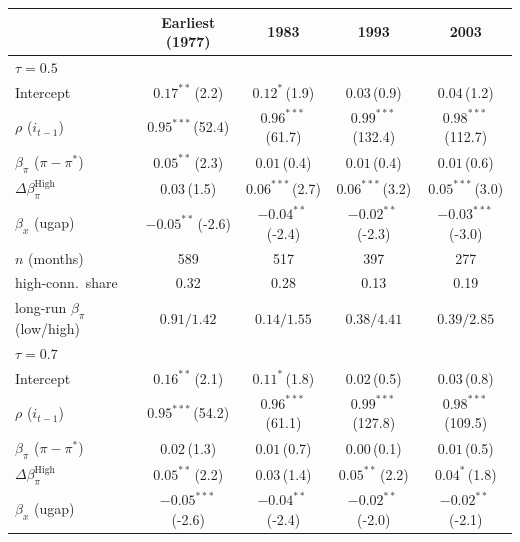 \setlength{\tabcolsep}{4pt}\scriptsize
\begin{tabular}{lcccc}
\toprule
 & Earliest (1977) & 1983 & 1993 & 2003 \\
\midrule
\multicolumn{5}{l}{\textit{$\tau=0.5$}} \\
Intercept & $0.17^{**}$\,{\scriptsize(2.2)} & $0.12^{*}$\,{\scriptsize(1.9)} & $0.03$\,{\scriptsize(0.9)} & $0.04$\,{\scriptsize(1.2)} \\
$\rho$ ($i_{t-1}$) & $0.95^{***}$\,{\scriptsize(52.4)} & $0.96^{***}$\,{\scriptsize(61.7)} & $0.99^{***}$\,{\scriptsize(132.4)} & $0.98^{***}$\,{\scriptsize(112.7)} \\
$\beta_\pi$ ($\pi-\pi^*$) & $0.05^{**}$\,{\scriptsize(2.3)} & $0.01$\,{\scriptsize(0.4)} & $0.01$\,{\scriptsize(0.4)} & $0.01$\,{\scriptsize(0.6)} \\
$\Delta\beta_\pi^{\text{High}}$ & $0.03$\,{\scriptsize(1.5)} & $0.06^{***}$\,{\scriptsize(2.7)} & $0.06^{***}$\,{\scriptsize(3.2)} & $0.05^{***}$\,{\scriptsize(3.0)} \\
$\beta_x$ (ugap) & $-0.05^{**}$\,{\scriptsize(-2.6)} & $-0.04^{**}$\,{\scriptsize(-2.4)} & $-0.02^{**}$\,{\scriptsize(-2.3)} & $-0.03^{***}$\,{\scriptsize(-3.0)} \\
\addlinespace
$n$ (months) & 589 & 517 & 397 & 277 \\
high-conn.\ share & 0.32 & 0.28 & 0.13 & 0.19 \\
long-run $\beta_\pi$ (low/high) & $0.91/1.42$ & $0.14/1.55$ & $0.38/4.41$ & $0.39/2.85$ \\
\midrule
\multicolumn{5}{l}{\textit{$\tau=0.7$}} \\
Intercept & $0.16^{**}$\,{\scriptsize(2.1)} & $0.11^{*}$\,{\scriptsize(1.8)} & $0.02$\,{\scriptsize(0.5)} & $0.03$\,{\scriptsize(0.8)} \\
$\rho$ ($i_{t-1}$) & $0.95^{***}$\,{\scriptsize(54.2)} & $0.96^{***}$\,{\scriptsize(61.1)} & $0.99^{***}$\,{\scriptsize(127.8)} & $0.98^{***}$\,{\scriptsize(109.5)} \\
$\beta_\pi$ ($\pi-\pi^*$) & $0.02$\,{\scriptsize(1.3)} & $0.01$\,{\scriptsize(0.7)} & $0.00$\,{\scriptsize(0.1)} & $0.01$\,{\scriptsize(0.5)} \\
$\Delta\beta_\pi^{\text{High}}$ & $0.05^{**}$\,{\scriptsize(2.2)} & $0.03$\,{\scriptsize(1.4)} & $0.05^{**}$\,{\scriptsize(2.2)} & $0.04^{*}$\,{\scriptsize(1.8)} \\
$\beta_x$ (ugap) & $-0.05^{***}$\,{\scriptsize(-2.6)} & $-0.04^{**}$\,{\scriptsize(-2.4)} & $-0.02^{**}$\,{\scriptsize(-2.0)} & $-0.02^{**}$\,{\scriptsize(-2.1)} \\

\end{tabular}
